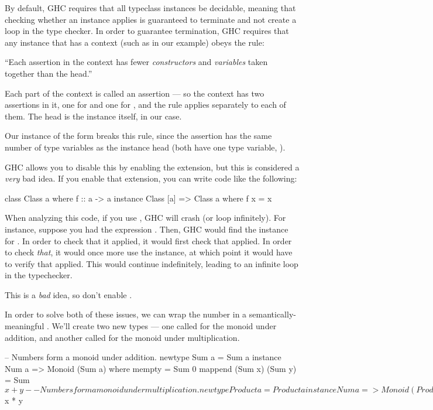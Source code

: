 \begin{tangent}[frametitle=Undecidable Instances]
By default, GHC requires that all typeclass instances be decidable, meaning that checking whether an
instance applies is guaranteed to terminate and not create a loop in the type checker. In order to
guarantee termination, GHC requires that any instance that has a context (such as 
in our example) obeys the rule:

``Each assertion in the context has fewer \emph{constructors} and \emph{variables} taken together
than the head.''

Each part of the context is called an assertion --- so the context  has two
assertions in it, one for  and one for , and the rule applies separately to
each of them. The head is the instance itself,  in our case.

Our instance of the form  breaks this rule, since the assertion has the
same number of type variables as the instance head (both have one type variable, ).

GHC allows you to disable this by enabling the  extension, but this is
considered a \emph{very} bad idea. If you enable that extension, you can write code like the
following:
\begin{haskell}
class Class a where
  f :: a -> a
instance Class [a] => Class a where
  f x = x
\end{haskell}
When analyzing this code, if you use , GHC will crash (or loop infinitely). For instance,
suppose you had the expression . Then, GHC would find the instance for . In order to check that it applied, it would first check that  applied. In
order to check \emph{that}, it would once more use the  instance, at which point it
would have to verify that  applied. This would continue indefinitely, leading to
an infinite loop in the typechecker. 

This is a \emph{bad} idea, so don't enable .
\end{tangent}

In order to solve both of these issues, we can wrap the number in a semantically-meaningful . 
We'll create two new types --- one called  for the monoid under addition, and another
called  for the monoid under multiplication.
\begin{haskell}
-- Numbers form a monoid under addition.
newtype Sum a = Sum a
instance Num a => Monoid (Sum a) where
  mempty = Sum 0
  mappend (Sum x) (Sum y) = Sum $ x + y

-- Numbers form a monoid under multiplication.
newtype Product a = Product a
instance Num a => Monoid (Product a) where
  mempty = Product 1
  mappend (Product x) (Product y) = Product $ x * y
\end{haskell}

